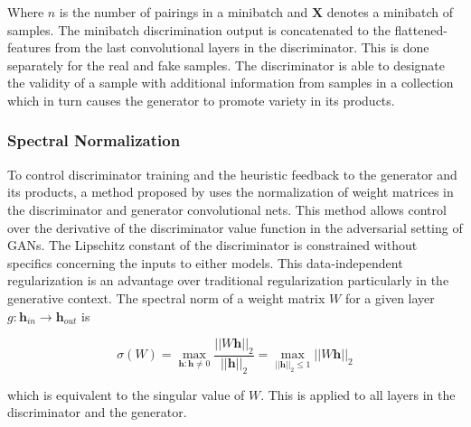 \documentclass[twocolumn]{article}
\numberwithin{equation}{section}
\begin{document}
Where $n$ is the number of pairings in a minibatch and  $\mathbf{X}$ denotes a minibatch of samples. The minibatch 
discrimination output is concatenated to the 
flattened-features from the last convolutional layers in the discriminator. This is done separately for the real and 
fake samples. The discriminator is able to designate the validity of a sample with additional information from samples 
in a collection which in turn causes the generator to promote variety in its products.


\subsubsection{Spectral Normalization}
To control discriminator training and the heuristic feedback to the generator and its products, a method proposed by 
\cite{spectral_norm} uses the normalization of weight matrices in the discriminator and generator convolutional nets. This 
method allows control over the derivative of the discriminator value function in the adversarial setting of GANs. The 
Lipschitz constant of the discriminator is constrained without specifics concerning the inputs to either models. This 
data-independent regularization is an advantage over traditional regularization particularly in the generative context. 
The spectral norm of a weight matrix $W$ for a given layer $g : \mathbf{h}_{in} \rightarrow \mathbf{h}_{out}$ is

\begin{equation}
    \sigma(W) = \max_{\mathbf{h}:\mathbf{h}\neq 0} \frac{|| W \mathbf{h}||_2}{||\mathbf{h}||_2}
              = \max_{||\mathbf{h}||_2 \leq 1} ||W\mathbf{h}||_2
\end{equation}

which is equivalent to the singular value of $W$. This is applied to all layers in the discriminator and the generator.

\end{document}
